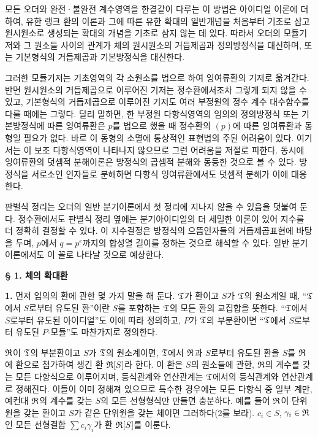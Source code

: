 모든 오더와 완전·불완전 계수영역을 한결같이 다루는 이 방법은 아이디얼 이론에 더하여, 유한 랭크 환의 이론과 그에 따른 유한 확대의 일반개념을 처음부터 기초로 삼고 원시원소로 생성되는 확대의 개념을 기초로 삼지 않는 데 있다. 따라서 오더의 모듈기저와 그 원소들 사이의 관계가 체의 원시원소의 거듭제곱과 정의방정식을 대신하며, 또는 기본형식의 거듭제곱과 기본방정식을 대신한다.

그러한 모듈기저는 기초영역의 각 소원소를 법으로 하여 잉여류환의 기저로 옮겨간다. 반면 원시원소의 거듭제곱으로 이루어진 기저는 정수환에서조차 그렇게 되지 않을 수 있고, 기본형식의 거듭제곱으로 이루어진 기저도 여러 부정원의 정수 계수 대수함수를 다룰 때에는 그렇다. 달리 말하면, 한 부정원 다항식영역의 임의의 정의방정식 또는 기본방정식에 따른 잉여류환은 \(p\)를 법으로 했을 때 정수환의 \((p)\)에 따른 잉여류환과 동형일 필요가 없다. 바로 이 동형의 소멸에 통상적인 표현법의 주된 어려움이 있다. 여기서는 이 보조 다항식영역이 나타나지 않으므로 그런 어려움을 저절로 피한다. 동시에 잉여류환의 덧셈적 분해이론은 방정식의 곱셈적 분해와 동등한 것으로 볼 수 있다. 방정식을 서로소인 인자들로 분해하면 다항식 잉여류환에서도 덧셈적 분해가 이에 대응한다.

판별식 정리는 오더의 일반 분기이론에서 첫 정리에 지나지 않을 수 있음을 덧붙여 둔다. 정수환에서도 판별식 정리 옆에는 분기아이디얼의 더 세밀한 이론이 있어 지수를 더 정확히 결정할 수 있다. 이 지수결정은 방정식의 으뜸인자들의 거듭제곱표현에 바탕을 두며, \(p\)에서 \(q=p^e\)까지의 합성열 길이를 정하는 것으로 해석할 수 있다. 일반 분기이론에서도 이 꼴로 나타날 것으로 예상한다.

\begin{center}
\textbf{§ 1. 체의 확대환}
\end{center}

\textbf{1.} 먼저 임의의 환에 관한 몇 가지 말을 해 둔다. \(\mathfrak{T}\)가 환이고 \(S\)가 \(\mathfrak{T}\)의 원소계일 때, “\(\mathfrak{T}\)에서 \(S\)로부터 유도된 환”이란 \(S\)를 포함하는 \(\mathfrak{T}\)의 모든 환의 교집합을 뜻한다. “\(\mathfrak{T}\)에서 \(S\)로부터 유도된 아이디얼”도 이에 따라 정의하고, \(P\)가 \(\mathfrak{T}\)의 부분환이면 “\(\mathfrak{T}\)에서 \(S\)로부터 유도된 \(P\)-모듈”도 마찬가지로 정의한다.

\(\mathfrak{R}\)이 \(\mathfrak{T}\)의 부분환이고 \(S\)가 \(\mathfrak{T}\)의 원소계이면, \(\mathfrak{T}\)에서 \(\mathfrak{R}\)과 \(S\)로부터 유도된 환을 \(S\)를 \(\mathfrak{R}\)에 환으로 첨가하여 생긴 환 \(\mathfrak{R}[S]\)라 한다. 이 환은 \(S\)의 원소들에 관한, \(\mathfrak{R}\)의 계수를 갖는 모든 다항식으로 이루어지며, 등식관계와 연산관계는 \(\mathfrak{T}\)에서의 등식관계와 연산관계로 정해진다. 이들이 이미 정해져 있으므로 특수한 경우에는 모든 다항식 중 일부 계만, 예컨대 \(\mathfrak{R}\)의 계수를 갖는 \(S\)의 모든 선형형식만 만들면 충분하다. 예를 들어 \(\mathfrak{R}\)이 단위원을 갖는 환이고 \(S\)가 같은 단위원을 갖는 체이면 그러하다(2를 보라). \(c_i\in S\), \(\gamma_i\in\mathfrak{R}\)인 모든 선형결합 \(\sum c_i\gamma_i\)가 환 \(\mathfrak{R}[S]\)를 이룬다.

